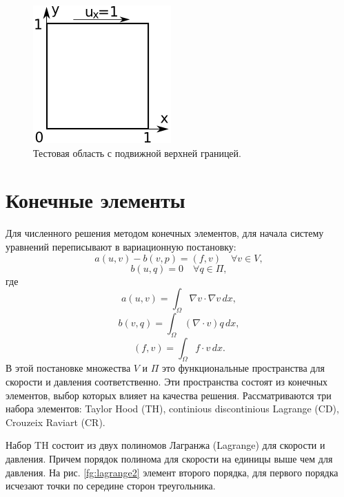 \documentclass[12pt]{article}
\begin{document}
\begin{figure}
	\begin{center}
		\includegraphics[width=200px]{pics/cavity400}
		\caption{Тестовая область с подвижной верхней границей.}
		\label{fg:cavity}
	\end{center}
\end{figure}

\section{Конечные элементы}
Для численного решения методом конечных элементов, для начала систему уравнений переписывают в вариационную постановку:
\begin{equation}
a(u,v)-b(v,p)=(f,v) \quad \forall v \in V,
\end{equation}
\begin{equation}
b(u,q)=0 \quad \forall q \in \Pi,
\end{equation}
где 
\begin{equation}
a(u,v)=\int_\Omega \nabla v \cdot \nabla v \, dx,
\end{equation}
\begin{equation}
b(v,q)=\int_\Omega (\nabla \cdot v) q \, dx,
\end{equation}
\begin{equation}
(f,v)=\int_\Omega f \cdot v \, dx.
\end{equation}
В этой постановке множества $V$ и $\Pi$ это функциональные пространства для скорости и давления соответственно. Эти пространства состоят из конечных элементов, выбор которых влияет на качества решения. Рассматриваются три набора элементов: Taylor Hood (TH), continious discontinious Lagrange (CD), Crouzeix Raviart (CR). 

Набор TH состоит из двух полиномов Лагранжа (Lagrange) для скорости и давления. Причем порядок полинома для скорости на единицы выше чем для давления. На рис. \ref{fg:lagrange2} элемент второго порядка, для первого порядка исчезают точки по середине сторон треугольника.
\end{document}

